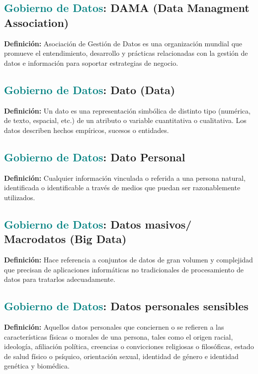 \documentclass[12pt]{article}
\begin{document}
\subsection{\textcolor{teal}{Gobierno de Datos}: DAMA (Data Managment Association)}
\textbf{Definición:} Asociación de Gestión de Datos es una organización mundial que promueve el entendimiento, desarrollo y prácticas relacionadas con la gestión de datos e información para soportar estrategias de negocio.

\subsection{\textcolor{teal}{Gobierno de Datos}: Dato (Data)}
\textbf{Definición:} Un dato es una representación simbólica de distinto tipo (numérica, de texto, espacial, etc.) de un atributo o variable cuantitativa o cualitativa. Los datos describen hechos empíricos, sucesos o entidades.
\subsection{\textcolor{teal}{Gobierno de Datos}: Dato Personal}
\textbf{Definición:} Cualquier información vinculada o referida a una persona natural, identificada o identificable a través de medios que puedan ser razonablemente utilizados.
\subsection{\textcolor{teal}{Gobierno de Datos}: Datos masivos/ Macrodatos (Big Data)}
\textbf{Definición:} Hace referencia a conjuntos de datos de gran volumen y complejidad que precisan de aplicaciones informáticas no tradicionales de procesamiento de datos para tratarlos adecuadamente.
\subsection{\textcolor{teal}{Gobierno de Datos}: Datos personales sensibles}
\textbf{Definición:} Aquellos datos personales que conciernen o se refieren a las características físicas o morales de una persona, tales como el origen racial, ideología, afiliación política, creencias o convicciones religiosas o filosóficas, estado de salud físico o psíquico, orientación sexual, identidad de género e identidad genética y biomédica. 
\end{document}
